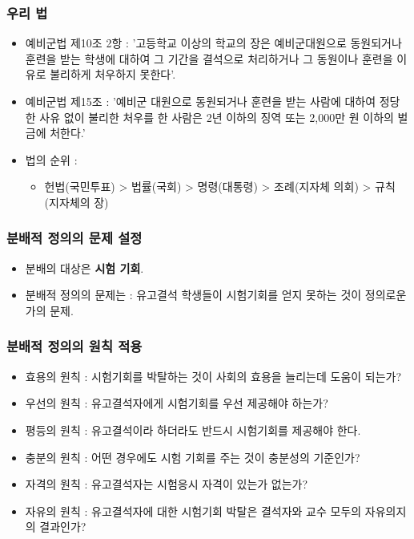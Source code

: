 \documentclass[aspectratio=169,xcolor=dvipsnames,]{beamer}
\begin{document}
\begin{frame}[<+->]
\frametitle{우리 법}
    \begin{itemize}
        \item 예비군법 제10조 2항 :  '고등학교 이상의 학교의 장은 예비군대원으로 동원되거나 훈련을 받는 학생에 대하여 그 기간을 결석으로 처리하거나 그 동원이나 훈련을 이유로 불리하게 처우하지 못한다'.
        \item 예비군법 제15조 : '예비군 대원으로 동원되거나 훈련을 받는 사람에 대하여 정당한 사유 없이 불리한 처우를 한 사람은 2년 이하의 징역 또는 2,000만 원 이하의 벌금에 처한다.'
        \item 법의 순위 : 
        \begin{itemize}
            \item 헌법(국민투표) > 법률(국회) > 명령(대통령) > 조례(지자체 의회) > 규칙(지자체의 장)
        \end{itemize}
    \end{itemize}
\end{frame}

\begin{frame}[<+->]
\frametitle{분배적 정의의 문제 설정}
    \begin{itemize}
        \item 분배의 대상은 \textbf{시험 기회}.
        \item 분배적 정의의 문제는 : 유고결석 학생들이 시험기회를 얻지 못하는 것이 정의로운가의 문제.
    \end{itemize}
\end{frame}

\begin{frame}[<+->]
\frametitle{분배적 정의의 원칙 적용}
    \begin{itemize}
        \item 효용의 원칙 : 시험기회를 박탈하는 것이 사회의 효용을 늘리는데 도움이 되는가?
        \item 우선의 원칙 : 유고결석자에게 시험기회를 우선 제공해야 하는가?
        \item 평등의 원칙 : 유고결석이라 하더라도 반드시 시험기회를 제공해야 한다.
        \item 충분의 원칙 : 어떤 경우에도 시험 기회를 주는 것이 충분성의 기준인가?
        \item 자격의 원칙 : 유고결석자는 시험응시 자격이 있는가 없는가?
        \item 자유의 원칙 : 유고결석자에 대한 시험기회 박탈은 결석자와 교수 모두의 자유의지의 결과인가?
    \end{itemize}
\end{frame}
\end{document}

